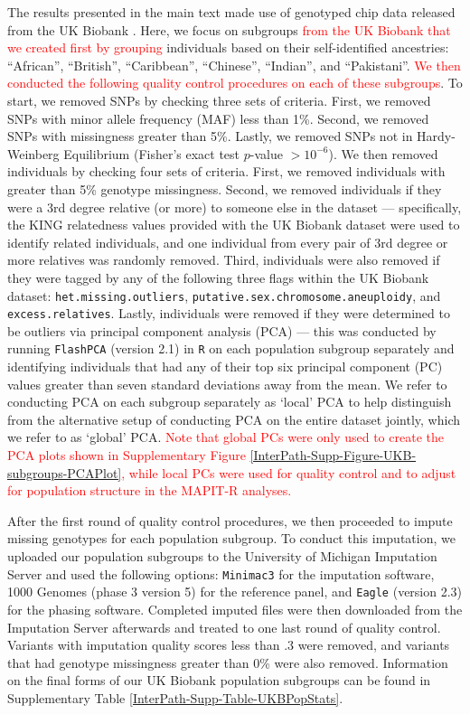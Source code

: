 \documentclass[10pt]{article}
\begin{document}
The results presented in the main text made use of genotyped chip data released from the UK Biobank \cite{Sudlow2015}. Here, we focus on subgroups \textcolor{red}{from the UK Biobank that we created first by grouping} individuals based on their self-identified ancestries: ``African'', ``British'', ``Caribbean'', ``Chinese'', ``Indian'', and ``Pakistani''. \textcolor{red}{We then conducted the following quality control procedures on each of these subgroups}. To start, we removed SNPs by checking three sets of criteria. First, we removed SNPs with minor allele frequency (MAF) less than 1\%. Second, we removed SNPs with missingness greater than 5\%. Lastly, we removed SNPs not in Hardy-Weinberg Equilibrium (Fisher's exact test $p$-value $> 10^{-6}$). We then removed individuals by checking four sets of criteria. First, we removed individuals with greater than 5\% genotype missingness. Second, we removed individuals if they were a 3rd degree relative (or more) to someone else in the dataset --- specifically, the KING relatedness values provided with the UK Biobank dataset were used to identify related individuals, and one individual from every pair of 3rd degree or more relatives was randomly removed. Third, individuals were also removed if they were tagged by any of the following three flags within the UK Biobank dataset: \texttt{het.missing.outliers}, \texttt{putative.sex.chromosome.aneuploidy}, and \texttt{excess.relatives}. Lastly, individuals were removed if they were determined to be outliers via principal component analysis (PCA) --- this was conducted by running \texttt{FlashPCA} (version 2.1) \cite{Abraham2017} in \texttt{R} on each population subgroup separately and identifying individuals that had any of their top six principal component (PC) values greater than seven standard deviations away from the mean. We refer to conducting PCA on each subgroup separately as `local' PCA to help distinguish from the alternative setup of conducting PCA on the entire dataset jointly, which we refer to as `global' PCA. \textcolor{red}{Note that global PCs were only used to create the PCA plots shown in Supplementary Figure \ref{InterPath-Supp-Figure-UKB-subgroups-PCAPlot}, while local PCs were used for quality control and to adjust for population structure in the MAPIT-R analyses.}  

After the first round of quality control procedures, we then proceeded to impute missing genotypes for each population subgroup. To conduct this imputation, we uploaded our population subgroups to the University of Michigan Imputation Server \cite{Das2016} and used the following options: \texttt{Minimac3} for the imputation software, 1000 Genomes (phase 3 version 5) for the reference panel, and \texttt{Eagle} (version 2.3) for the phasing software. Completed imputed files were then downloaded from the Imputation Server afterwards and treated to one last round of quality control. Variants with imputation quality scores  less than .3 were removed, and variants that had genotype missingness greater than 0\% were also removed. Information on the final forms of our UK Biobank population subgroups can be found in Supplementary Table \ref{InterPath-Supp-Table-UKBPopStats}.
\end{document}
